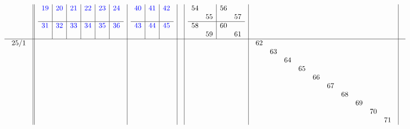 \documentclass[11pt,a4paper]{amsart}
\begin{document}
\begin{align*}
\begin{array}{r||c|c|c|c|c|c}
\begin{array}{r}
    \end{array}
    &
\begin{array}{r|r|r|r|r|r}
\textcolor{blue}{19}&\textcolor{blue}{20}&\textcolor{blue}{21}&\textcolor{blue}{22}&\textcolor{blue}{23}&\textcolor{blue}{24}\\
&&&&&\\ \hline
\textcolor{blue}{31}&\textcolor{blue}{32}&\textcolor{blue}{33}&\textcolor{blue}{34}&\textcolor{blue}{35}&\textcolor{blue}{36}\\
&&&&&\\
\end{array}
&
\begin{array}{r|r|r}%
\textcolor{blue}{40}&\textcolor{blue}{41}&\textcolor{blue}{42}\\
&&\\ \hline
\textcolor{blue}{43}&\textcolor{blue}{44}&\textcolor{blue}{45}\\
&&\\
\end{array}
&&
\begin{array}{rr|rr}
54&&56&\\
&55&&57\\ \hline
58&&60&\\
&59&&61
\end{array}
&& \\ \hline
    \begin{array}{r}
25/1\\ \\ \\ \\ \\ \\ \\ \\ \\ \\
    \end{array}
    &&&&&
\begin{array}{rrrrrrrrrr}%
62&&&&&&&&&\\%
&63&&&&&&&&\\%
&&64&&&&&&&\\%
&&&65&&&&&&\\%
&&&&66&&&&&\\%
&&&&&67&&&&\\%
&&&&&&68&&&\\%
&&&&&&&69&&\\%
&&&&&&&&70&\\%
&&&&&&&&&71\\%
\end{array}%

\end{array}
\end{align*}
\end{document}
